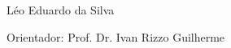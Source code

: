 \begin{folhaderosto}
	\begin{center}    
		
		\vspace*{\fill}\vspace*{\fill}
		\begin{center}
			\ABNTEXchapterfont\bfseries\Large\imprimirtitulo
		\end{center}
		\vspace*{\fill}
		
		\hspace{.45\textwidth}
		\begin{minipage}{.5\textwidth}
			\SingleSpacing
			\imprimirpreambulo
		\end{minipage}%
		
		\vspace*{1cm}
		\begin{flushright}
			\noindent Léo Eduardo da Silva
		\end{flushright}
		\vspace*{1cm}
		\begin{flushright}
			\noindent Orientador: Prof. Dr. Ivan Rizzo Guilherme
		\end{flushright}
		\vspace*{1cm}
		
		
		{\large\imprimirlocal}
		\par
		{\large\imprimirdata}
		\vspace*{1cm}
		
	\end{center}
\end{folhaderosto}